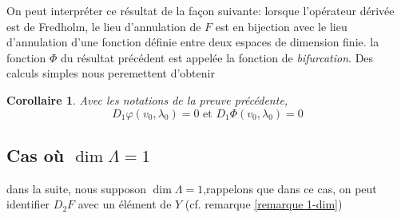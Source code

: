 \documentclass[a4paper,12pt,oneside,titlepage]{article}
\theoremstyle{definition}
\theoremstyle{plain}
\newtheorem{corollaire}[definition]{Corollaire}
\begin{document}
On peut interpréter ce résultat de la façon suivante: lorsque l'opérateur dérivée est de Fredholm, le lieu d'annulation de $F$ est en bijection avec le lieu d'annulation d'une fonction définie entre deux espaces de dimension finie. la fonction $\Phi$ du résultat précédent est appelée la fonction de \textit{bifurcation}.
Des calculs simples nous peremettent d'obtenir
\begin{corollaire}\label{corr-deriv-o}
    Avec les notations de la preuve précédente, 
    \begin{equation*}
        D_1\varphi(v_0,\lambda_0)=0\text{ et }    D_1\Phi(v_0,\lambda_0)=0
    \end{equation*}
\end{corollaire}




\subsection{Cas où $\dim \Lambda=1$}
dans la suite, nous supposon $\dim \Lambda = 1$,rappelons que dans ce cas, on peut identifier $D_2F$ avec un élément de $Y$ (cf. remarque \ref{remarque 1-dim})
\end{document}
